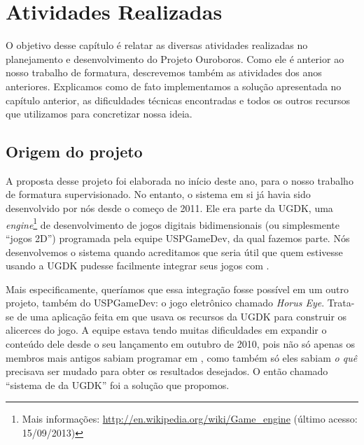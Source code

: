 \chapter{Atividades Realizadas}
\label{cap:atividades}

  O objetivo desse capítulo é relatar as diversas atividades realizadas no 
  planejamento e desenvolvimento do Projeto Ouroboros. Como ele é
  anterior ao nosso trabalho de formatura, descrevemos também as atividades dos
  anos anteriores. Explicamos como de fato implementamos a solução apresentada no
  capítulo anterior, as dificuldades técnicas encontradas e todos os outros
  recursos que utilizamos para concretizar nossa ideia.

  
  \section{Origem do projeto}
  \label{sec:atividades:origem}
  
    A proposta desse projeto foi elaborada no início deste ano, para o nosso
    trabalho de formatura supervisionado. No entanto, o sistema em si já havia
    sido desenvolvido por nós desde o começo de 2011. Ele era parte da UGDK, uma
    \emph{engine}\footnote{Mais informações:
    \url{http://en.wikipedia.org/wiki/Game\_engine} (último acesso: 15/09/2013)}
    de desenvolvimento de jogos digitais bidimensionais (ou
    simplesmente ``jogos 2D'') programada pela equipe USPGameDev, da qual
    fazemos parte. Nós desenvolvemos o sistema quando acreditamos que seria útil
    que quem estivesse usando a UGDK pudesse facilmente integrar seus jogos com .

    Mais especificamente, queríamos que essa integração fosse possível em um
    outro projeto, também do USPGameDev: o jogo eletrônico chamado \emph{Horus
    Eye}\footnotemark. Trata-se de uma aplicação feita em \CXX{} que usava os
    recursos da UGDK para construir os alicerces do jogo. A equipe estava tendo
    muitas dificuldades em expandir o conteúdo dele desde o seu lançamento em
    outubro de 2010, pois não só apenas os membros mais antigos sabiam programar
    em \CXX{}, como também só eles sabiam \emph{o quê} precisava ser mudado para
    obter os resultados desejados. O então chamado ``sistema de  da
    UGDK'' foi a solução que propomos.

